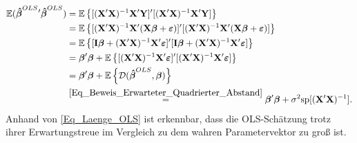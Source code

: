\documentclass[12pt, a4paper]{report}\usepackage[]{graphicx}\usepackage[]{color}
\begin{document}
\begin{align}\label{Eq_Laenge_OLS}
\mathbb{E}(\boldsymbol{\hat{\beta}}^{OLS} {'}\boldsymbol{\hat{\beta}}^{OLS})
&=\mathbb{E}\left\lbrace [(\mathbf{X}'\mathbf{X})^{-1}\mathbf{X}'\mathbf{Y}]'[(\mathbf{X}'\mathbf{X})^{-1}\mathbf{X}'\mathbf{Y}] \right\rbrace \notag \\
&=\mathbb{E}\left\lbrace [(\mathbf{X}'\mathbf{X})^{-1}\mathbf{X}'(\mathbf{X}\boldsymbol{\beta} + \boldsymbol{\varepsilon})]'
[(\mathbf{X}'\mathbf{X})^{-1}\mathbf{X}'(\mathbf{X}\boldsymbol{\beta} + \boldsymbol{\varepsilon})]
\right\rbrace \notag \\
&=\mathbb{E}\left\lbrace
[\mathbf{I}\boldsymbol{\beta} + (\mathbf{X}'\mathbf{X})^{-1}\mathbf{X}'\boldsymbol{\varepsilon}]'[\mathbf{I}\boldsymbol{\beta} + (\mathbf{X}'\mathbf{X})^{-1}\mathbf{X}'\boldsymbol{\varepsilon}]
\right\rbrace \notag \\
&=\boldsymbol{\beta}'\boldsymbol{\beta} +
\mathbb{E}\left\lbrace
[(\mathbf{X}'\mathbf{X})^{-1}\mathbf{X}'\boldsymbol{\varepsilon}]'[(\mathbf{X}'\mathbf{X})^{-1}\mathbf{X}'\boldsymbol{\varepsilon}]
\right\rbrace \notag \\
&=\boldsymbol{\beta}'\boldsymbol{\beta} +
\mathbb{E} \left\lbrace \mathcal{D}(\boldsymbol{\hat{\beta}}^{OLS},\boldsymbol{\beta}) \right\rbrace \notag \\
&\stackrel{\eqref{Eq_Beweis_Erwarteter_Quadrierter_Abstand}}{=}\boldsymbol{\beta}'\boldsymbol{\beta} + 
\sigma^2 \text{sp}[(\mathbf{X}'\mathbf{X})^{-1}].
\end{align}
Anhand von \eqref{Eq_Laenge_OLS} ist erkennbar, dass die OLS-Schätzung trotz ihrer Erwartungstreue im Vergleich zu dem wahren Parametervektor zu groß ist. 
\end{document}
